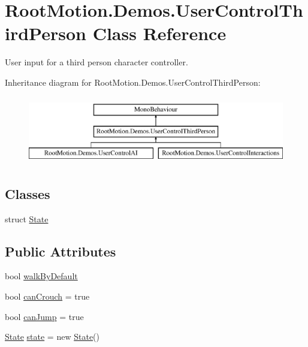 \hypertarget{class_root_motion_1_1_demos_1_1_user_control_third_person}{}\section{Root\+Motion.\+Demos.\+User\+Control\+Third\+Person Class Reference}
\label{class_root_motion_1_1_demos_1_1_user_control_third_person}


User input for a third person character controller.  


Inheritance diagram for Root\+Motion.\+Demos.\+User\+Control\+Third\+Person\+:\begin{figure}[H]
\begin{center}
\leavevmode
\includegraphics[height=3.000000cm]{class_root_motion_1_1_demos_1_1_user_control_third_person}
\end{center}
\end{figure}
\subsection*{Classes}
\begin{DoxyCompactItemize}
\item 
struct \mbox{\hyperlink{struct_root_motion_1_1_demos_1_1_user_control_third_person_1_1_state}{State}}
\end{DoxyCompactItemize}
\subsection*{Public Attributes}
\begin{DoxyCompactItemize}
\item 
bool \mbox{\hyperlink{class_root_motion_1_1_demos_1_1_user_control_third_person_a44bc0cc4d5f6b1491b73793c6f97e52b}{walk\+By\+Default}}
\item 
bool \mbox{\hyperlink{class_root_motion_1_1_demos_1_1_user_control_third_person_a191b6a7cea8cb86eaab2b583221393df}{can\+Crouch}} = true
\item 
bool \mbox{\hyperlink{class_root_motion_1_1_demos_1_1_user_control_third_person_a45e279cf108c9ffd60c2e84adcb4f76b}{can\+Jump}} = true
\item 
\mbox{\hyperlink{struct_root_motion_1_1_demos_1_1_user_control_third_person_1_1_state}{State}} \mbox{\hyperlink{class_root_motion_1_1_demos_1_1_user_control_third_person_acaa6928e2932bf673a3f8c119d8e37f8}{state}} = new \mbox{\hyperlink{struct_root_motion_1_1_demos_1_1_user_control_third_person_1_1_state}{State}}()
\end{DoxyCompactItemize}

